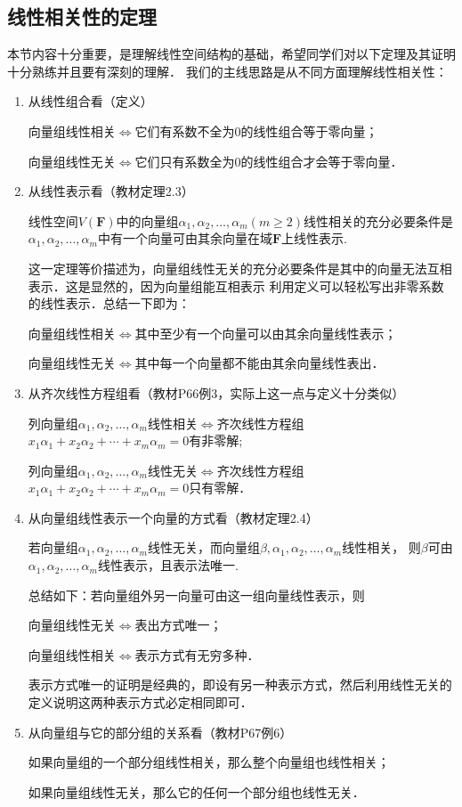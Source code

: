 \subsection{线性相关性的定理}
本节内容十分重要，是理解线性空间结构的基础，希望同学们对以下定理及其证明十分熟练并且要有深刻的理解．
我们的主线思路是从不同方面理解线性相关性：
\begin{enumerate}
	\item 从线性组合看（定义）

	      向量组线性相关$\iff$它们有系数不全为0的线性组合等于零向量；

	      向量组线性无关$\iff$它们只有系数全为0的线性组合才会等于零向量．
	\item 从线性表示看（教材定理2.3）
	      \begin{theorem}
		      线性空间$V(\mathbf{F})$中的向量组$\alpha_1,\alpha_2,\ldots,\alpha_m(m \ge 2)$线性相关的充分必要条件是
		      $\alpha_1,\alpha_2,\ldots,\alpha_m$中有一个向量可由其余向量在域$\mathbf{F}$上线性表示.
	      \end{theorem}
	      这一定理等价描述为，向量组线性无关的充分必要条件是其中的向量无法互相表示．这是显然的，因为向量组能互相表示
	      利用定义可以轻松写出非零系数的线性表示．总结一下即为：

	      向量组线性相关$\iff$其中至少有一个向量可以由其余向量线性表示；

	      向量组线性无关$\iff$其中每一个向量都不能由其余向量线性表出．
	\item 从齐次线性方程组看（教材P66例3，实际上这一点与定义十分类似）

	      列向量组$\alpha_1,\alpha_2,\ldots,\alpha_m$线性相关$\iff$齐次线性方程组$x_1\alpha_1+x_2\alpha_2+\cdots+x_m\alpha_m=0$有非零解;

	      列向量组$\alpha_1,\alpha_2,\ldots,\alpha_m$线性无关$\iff$齐次线性方程组$x_1\alpha_1+x_2\alpha_2+\cdots+x_m\alpha_m=0$只有零解．
	\item 从向量组线性表示一个向量的方式看（教材定理2.4）
	      \begin{theorem}
		      若向量组$\alpha_1,\alpha_2,\ldots,\alpha_m$线性无关，而向量组$\beta,\alpha_1,\alpha_2,\ldots,\alpha_m$线性相关，
		      则$\beta$可由$\alpha_1,\alpha_2,\ldots,\alpha_m$线性表示，且表示法唯一.
	      \end{theorem}
	      总结如下：若向量组外另一向量可由这一组向量线性表示，则

	      向量组线性无关$\iff$表出方式唯一；

	      向量组线性相关$\iff$表示方式有无穷多种．

	      表示方式唯一的证明是经典的，即设有另一种表示方式，然后利用线性无关的定义说明这两种表示方式必定相同即可．
	\item 从向量组与它的部分组的关系看（教材P67例6）

	      如果向量组的一个部分组线性相关，那么整个向量组也线性相关；

	      如果向量组线性无关，那么它的任何一个部分组也线性无关．
\end{enumerate}

